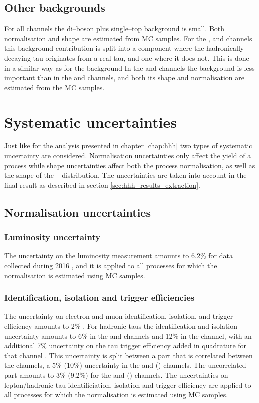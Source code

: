 \subsection{Other backgrounds}
\label{sec:mssm_bkgs_other}
For all channels the di--boson plus 
single--top background is small.
Both normalisation and shape are estimated from \ac{MC}
samples. For the \etau, \mutau and \tautau channels
this background contribution is split into a component
where the hadronically decaying tau originates from a real
tau, and one where it does not. This is done in a similar
way as for the \ttbar background
In the \tautau and \emu channels the \Wjets background
is less important than in the \etau and \mutau channels, and both
its shape and normalisation are estimated from the
\ac{MC} samples.


\section{Systematic uncertainties}
\label{sec:mssm_uncs}
Just like for the analysis presented in chapter \ref{chap:hhh}
two types of systematic uncertainty are considered. Normalisation
uncertainties only affect the yield of a process while shape
uncertainties affect both the process normalisation, as well as the shape
of the \mTtot~ distribution. The uncertainties are taken into account 
in the final result as described in section \ref{sec:hhh_results_extraction}.

\subsection{Normalisation uncertainties}
\label{sec:mssm_uncs_norm}
\subsubsection*{Luminosity uncertainty}
The uncertainty on the luminosity measurement amounts to 6.2\% for
data collected during 2016 \cite{cms-pas-lum-15-001}, and it is
applied to all processes for which the normalisation is estimated 
using \ac{MC} samples.
\subsubsection*{Identification, isolation and trigger efficiencies}
The uncertainty on electron and muon identification, isolation, and
trigger efficiency amounts to 2\% \cite{CMS-PAS-HIG-16-037}. For hadronic taus the identification and
isolation uncertainty amounts to 6\% in the \etau and \mutau channels
and 12\% in the \tautau channel, with an additional 7\% uncertainty
on the tau trigger efficiency added in quadrature for that channel \cite{CMS-PAS-HIG-16-037}. This
uncertainty is split between a part that is correlated between the channels, 
a 5\% (10\%) uncertainty in the \etau and \mutau (\tautau) channels. The uncorrelated 
part amounts to 3\% (9.2\%) for the \etau and \mutau (\tautau) channels.
The uncertainties on lepton/hadronic tau identificiation, isolation and 
trigger efficiency are applied to all processes for which the normalisation
is estimated using \ac{MC} samples.
